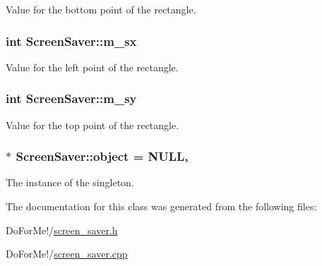 Value for the bottom point of the rectangle. 

\hypertarget{class_screen_saver_a492aa831394b15bbdf2c85e99c1af87c}{
\subsubsection[{m\-\_\-sx}]{\setlength{\rightskip}{0pt plus 5cm}int Screen\-Saver\-::m\-\_\-sx\hspace{0.3cm}{\ttfamily [private]}}}\label{class_screen_saver_a492aa831394b15bbdf2c85e99c1af87c}


Value for the left point of the rectangle. 

\hypertarget{class_screen_saver_a2a8ec41c3b6fc61e762bd6d8d8f7e347}{
\subsubsection[{m\-\_\-sy}]{\setlength{\rightskip}{0pt plus 5cm}int Screen\-Saver\-::m\-\_\-sy\hspace{0.3cm}{\ttfamily [private]}}}\label{class_screen_saver_a2a8ec41c3b6fc61e762bd6d8d8f7e347}


Value for the top point of the rectangle. 

\hypertarget{class_screen_saver_a2ec2b57eec392500275d7f9afc76859d}{
\subsubsection[{object}]{ $\ast$ Screen\-Saver\-::object = N\-U\-L\-L\hspace{0.3cm}{\ttfamily [static]}, {\ttfamily [private]}}}\label{class_screen_saver_a2ec2b57eec392500275d7f9afc76859d}


The instance of the singleton. 



The documentation for this class was generated from the following files\-:\begin{DoxyCompactItemize}
\item 
Do\-For\-Me!/\hyperlink{screen__saver_8h}{screen\-\_\-saver.\-h}\item 
Do\-For\-Me!/\hyperlink{screen__saver_8cpp}{screen\-\_\-saver.\-cpp}\end{DoxyCompactItemize}
